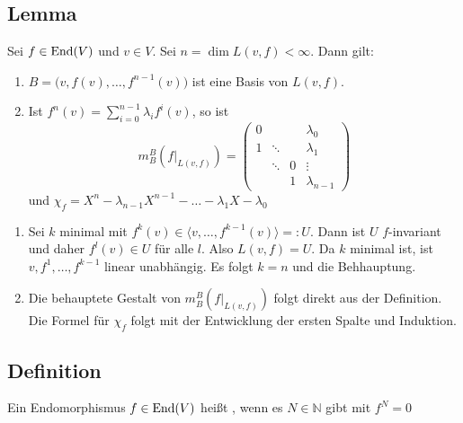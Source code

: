 \subsection[Lemma über die Eigenschaften von $L(v,f)$]{Lemma} %
\label{sub:614}
Sei $f \in \operatorname{End}(V)$ und $v \in V$. Sei $n= \dim L(v,f) < \infty$. Dann gilt:
\begin{enumerate}[(1)]
	\item $B=\big(v, f(v), \ldots , f^{n-1} (v)\big)$ ist eine Basis von $L(v,f)$.
	\item Ist $f^n(v) = \sum_{i=0}^{n-1} \lambda_i f^i (v)$, so ist 
	\[
		m_B^B (f|_{L(v,f)}) = \begin{pmatrix}
			0 & & & \lambda_0 \\
			1 & \ddots & & \lambda_1 \\
			& \ddots & 0 & \vdots \\
			& & 1 & \lambda_{n-1}
		\end{pmatrix}
	\]
	und $\chi_f = X^n - \lambda_{n-1} X^{n-1} - \ldots  - \lambda_1 X - \lambda_0$
\end{enumerate}
\begin{enumerate}[(1)]
	\item Sei $k$ minimal mit $f^k (v) \in \langle v, \ldots , f^{k-1}(v) \rangle =: U$. Dann ist $U$ $f$-invariant und daher $f^l (v) \in U$ für alle $l$.
	Also $L(v,f)= U$. Da $k$ minimal ist, ist $v, f^1 , \ldots , f^{k-1}$ linear unabhängig. Es folgt $k=n$ und die Behhauptung. \bewende
	\item Die behauptete Gestalt von $m_B^B (f|_{L(v,f)})$ folgt direkt aus der Definition. Die Formel für $\chi_f$ folgt mit der Entwicklung der ersten Spalte und 
	Induktion. \bewende
\end{enumerate}

\subsection[Definition: nilpotenter Endomorphismus]{Definition} %
\label{sub:615}
Ein Endomorphismus $f \in \operatorname{End}(V)$ heißt , wenn es $N \in \mathds{N}$ gibt mit $f^N = 0$ 

